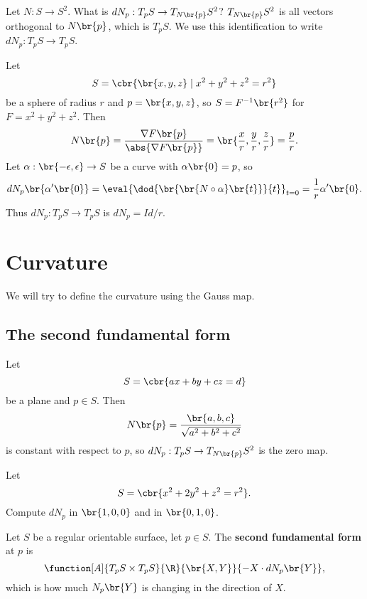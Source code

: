 Let $ N : S \to S^2 $. What is $ dN_p : T_pS \to T_{N\br{p}}S^2 $? $ T_{N\br{p}}S^2 $ is all vectors orthogonal to $ N\br{p} $, which is $ T_pS $. We use this identification to write $ dN_p : T_pS \to T_pS $.

\begin{example*}
Let
$$ S = \cbr{\br{x, y, z} \mid x^2 + y^2 + z^2 = r^2} $$
be a sphere of radius $ r $ and $ p = \br{x, y, z} $, so $ S = F^{-1}\br{r^2} $ for $ F = x^2 + y^2 + z^2 $. Then
$$ N\br{p} = \dfrac{\nabla F\br{p}}{\abs{\nabla F\br{p}}} = \br{\dfrac{x}{r}, \dfrac{y}{r}, \dfrac{z}{r}} = \dfrac{p}{r}. $$
Let $ \alpha : \br{-\epsilon, \epsilon} \to S $ be a curve with $ \alpha\br{0} = p $, so
$$ dN_p\br{\alpha'\br{0}} = \eval{\dod{\br{\br{N \circ \alpha}\br{t}}}{t}}_{t = 0} = \dfrac{1}{r}\alpha'\br{0}. $$
Thus $ dN_p : T_pS \to T_pS $ is $ dN_p = Id / r $.
\end{example*}

\pagebreak

\section{Curvature}

We will try to define the curvature using the Gauss map.


\subsection{The second fundamental form}

\begin{example*}
Let
$$ S = \cbr{ax + by + cz = d} $$
be a plane and $ p \in S $. Then
$$ N\br{p} = \dfrac{\br{a, b, c}}{\sqrt{a^2 + b^2 + c^2}} $$
is constant with respect to $ p $, so $ dN_p : T_pS \to T_{N\br{p}}S^2 $ is the zero map.
\end{example*}

\begin{example*}
Let
$$ S = \cbr{x^2 + 2y^2 + z^2 = r^2}. $$
Compute $ dN_p $ in $ \br{1, 0, 0} $ and in $ \br{0, 1, 0} $.
\end{example*}

\begin{definition}
Let $ S $ be a regular orientable surface, let $ p \in S $. The \textbf{second fundamental form} at $ p $ is
$$ \function[A]{T_pS \times T_pS}{\R}{\br{X, Y}}{-X \cdot dN_p\br{Y}}, $$
which is how much $ N_p\br{Y} $ is changing in the direction of $ X $.
\end{definition}

